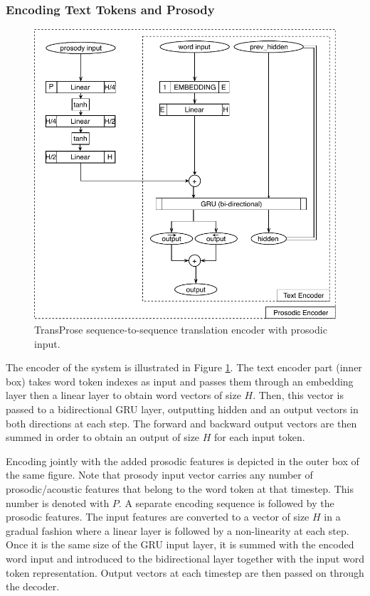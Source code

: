 \subsubsection{Encoding Text Tokens and Prosody}

\begin{figure}
\centering
\includegraphics[width=0.7\linewidth]{img/TransProse_Encoder.pdf}
\caption{TransProse sequence-to-sequence translation encoder with prosodic input.}
\label{figure:transprose_encoder}
\end{figure}

The encoder of the system is illustrated in Figure \ref{figure:transprose_encoder}. The text encoder part (inner box) takes word token indexes as input and passes them through an embedding layer then a linear layer to obtain word vectors of size $H$. Then, this vector is passed to a bidirectional GRU layer, outputting hidden and an output vectors in both directions at each step. The forward and backward output vectors are then summed in order to obtain an output of size $H$ for each input token. 

Encoding jointly with the added prosodic features is depicted in the outer box of the same figure. Note that prosody input vector carries any number of prosodic/acoustic features that belong to the word token at that timestep. This number is denoted with $P$. A separate encoding sequence is followed by the prosodic features. The input features are converted to a vector of size $H$ in a gradual fashion where a linear layer is followed by a non-linearity at each step. Once it is the same size of the GRU input layer, it is summed with the encoded word input and introduced to the bidirectional layer together with the input word token representation. Output vectors at each timestep are then passed on through the decoder. 

